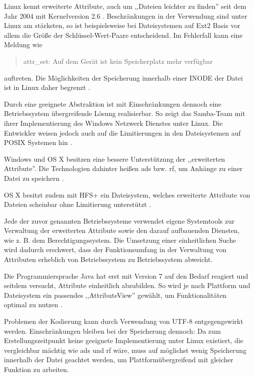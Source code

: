 \documentclass[oneside, ngerman, toc=bibliography,bibliography=totoc,listof=entryprefix, open=right,numbers=noenddot,fontsize=12pt]{scrbook}
\begin{document}
Linux kennt erweiterte Attribute, auch um ,,Dateien leichter zu finden'' seit dem Jahr 2004 mit Kernelversion 2.6 \cite{von2006100}. Beschränkungen in der Verwendung sind unter Linux am stärksten, so ist beispielsweise bei Dateisystemen auf Ext2 Basis vor allem die Größe der Schlüssel-Wert-Paare entscheidend. Im Fehlerfall kann eine Meldung wie

\begin{quote}
attr\_set: Auf dem Gerät ist kein Speicherplatz mehr verfügbar
\end{quote}

auftreten. Die Möglichkeiten der Speicherung innerhalb einer INODE der Datei ist in Linux daher begrenzt \cite{kernelwiki}.

Durch eine geeignete Abstraktion ist mit Einschränkungen dennoch eine Betriebssystem übergreifende Lösung realisierbar. So zeigt das Samba-Team mit ihrer Implementierung des Windows Netzwerk Dienstes unter Linux. Die Entwickler weisen jedoch auch auf die Limitierungen in den Dateisystemen auf POSIX Systemen hin  \cite{smb}.

Windows und OS X besitzen eine bessere Unterstützung der ,,erweiterten Attribute''. Die Technologien dahinter heißen \acrfull{ads} bzw.  \acrfull{rf},  um Anhänge zu einer Datei zu speichern \cite{surendorf2010mac}.

OS X besitzt zudem mit HFS+ ein Dateisystem, welches erweiterte Attribute von Dateien scheinbar ohne Limitierung unterstützt \cite{macdsa}.

Jede der zuvor genannten Betriebssysteme verwendet eigene Systemtools zur Verwaltung der erweiterten Attribute sowie den darauf aufbauenden Diensten, wie z. B. dem Berechtigungssystem. Die Umsetzung einer einheitlichen Suche wird dadurch erschwert, dass der Funktionsumfang in der Verwaltung von Attributen erheblich von Betriebssystem zu Betriebssystem abweicht.

Die Programmiersprache Java hat erst mit Version 7 auf den Bedarf reagiert und seitdem versucht, Attribute einheitlich abzubilden. So wird je nach Plattform und Dateisystem ein passendes ,,AttributeView'' gewählt, um Funktionalitäten optimal zu nutzen \cite{javanio}.

Problemen der Kodierung kann durch Verwendung von UTF-8 entgegengewirkt werden.
Einschränkungen bleiben bei der Speicherung dennoch: Da zum Erstellungszeitpunkt keine geeignete Implementierung unter Linux existiert, die vergleichbar mächtig  wie \acrshort{ads} und \acrshort{rf} wäre, muss auf möglichst wenig Speicherung innerhalb der Datei geachtet werden, um Plattformübergreifend mit gleicher Funktion zu arbeiten.
\end{document}
